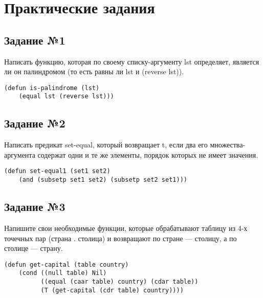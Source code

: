 \chapter{Практические задания}

\section{Задание №1}

Написать функцию, которая по своему списку-аргументу lst определяет, является
ли он палиндромом (то есть равны ли lst и (reverse lst)).

\vspace{4mm}
\hfill
\begin{minipage}{0.92\linewidth}
\begin{lstlisting}
(defun is-palindrome (lst)
    (equal lst (reverse lst)))
\end{lstlisting}
\end{minipage}

\section{Задание №2}

Написать предикат set-equal, который возвращает t, если два его
множества-аргумента содержат одни и те же элементы, порядок которых не имеет
значения.

\vspace{4mm}
\begin{minipage}{0.92\linewidth}
\begin{lstlisting}
(defun set-equal1 (set1 set2)
    (and (subsetp set1 set2) (subsetp set2 set1)))
\end{lstlisting}
\end{minipage}

\section{Задание №3}

Напишите свои необходимые функции, которые обрабатывают таблицу из 4-х точечных
пар (страна . столица) и возвращают по стране --- столицу, а по столице ---
страну.

\vspace{4mm}
\begin{minipage}{0.92\linewidth}
\begin{lstlisting}
(defun get-capital (table country)
    (cond ((null table) Nil)
          ((equal (caar table) country) (cdar table))
          (T (get-capital (cdr table) country))))
\end{lstlisting}
\end{minipage}

